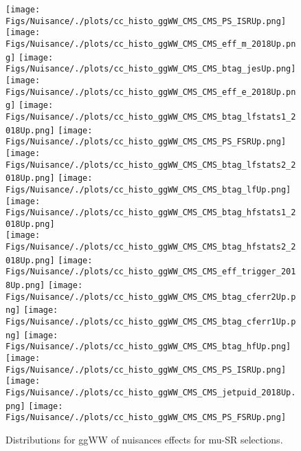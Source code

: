\begin{figure*}[htbp]  
\centering 
\texttt{[image: Figs/Nuisance/./plots/cc\_histo\_ggWW\_CMS\_CMS\_PS\_ISRUp.png]}
\texttt{[image: Figs/Nuisance/./plots/cc\_histo\_ggWW\_CMS\_CMS\_eff\_m\_2018Up.png]}
\texttt{[image: Figs/Nuisance/./plots/cc\_histo\_ggWW\_CMS\_CMS\_btag\_jesUp.png]}
\texttt{[image: Figs/Nuisance/./plots/cc\_histo\_ggWW\_CMS\_CMS\_eff\_e\_2018Up.png]}
\texttt{[image: Figs/Nuisance/./plots/cc\_histo\_ggWW\_CMS\_CMS\_btag\_lfstats1\_2018Up.png]}
\texttt{[image: Figs/Nuisance/./plots/cc\_histo\_ggWW\_CMS\_CMS\_PS\_FSRUp.png]}
\texttt{[image: Figs/Nuisance/./plots/cc\_histo\_ggWW\_CMS\_CMS\_btag\_lfstats2\_2018Up.png]}
\texttt{[image: Figs/Nuisance/./plots/cc\_histo\_ggWW\_CMS\_CMS\_btag\_lfUp.png]}
\texttt{[image: Figs/Nuisance/./plots/cc\_histo\_ggWW\_CMS\_CMS\_btag\_hfstats1\_2018Up.png]}\\
\texttt{[image: Figs/Nuisance/./plots/cc\_histo\_ggWW\_CMS\_CMS\_btag\_hfstats2\_2018Up.png]}
\texttt{[image: Figs/Nuisance/./plots/cc\_histo\_ggWW\_CMS\_CMS\_eff\_trigger\_2018Up.png]}
\texttt{[image: Figs/Nuisance/./plots/cc\_histo\_ggWW\_CMS\_CMS\_btag\_cferr2Up.png]}
\texttt{[image: Figs/Nuisance/./plots/cc\_histo\_ggWW\_CMS\_CMS\_btag\_cferr1Up.png]}
\texttt{[image: Figs/Nuisance/./plots/cc\_histo\_ggWW\_CMS\_CMS\_btag\_hfUp.png]}
\texttt{[image: Figs/Nuisance/./plots/cc\_histo\_ggWW\_CMS\_CMS\_PS\_ISRUp.png]}
\texttt{[image: Figs/Nuisance/./plots/cc\_histo\_ggWW\_CMS\_CMS\_jetpuid\_2018Up.png]}
\texttt{[image: Figs/Nuisance/./plots/cc\_histo\_ggWW\_CMS\_CMS\_PS\_FSRUp.png]}
\\ 
\caption{ 
   Distributions for ggWW of nuisances effects for mu-SR selections.
} 
\label{fig:ggWW_mu_SR} 
\end{figure*} 




